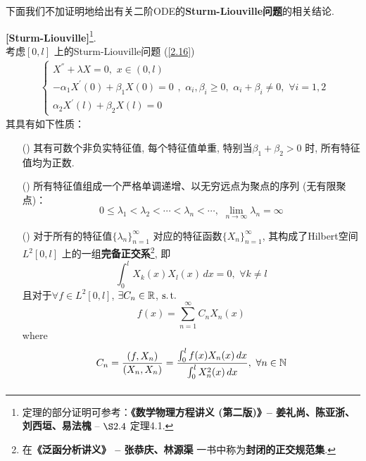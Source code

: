 	\vspace*{6em}
	
	下面我们不加证明地给出有关二阶ODE的\textbf{Sturm-Liouville问题}的相关结论. 
	
	\newpage
	
	\begin{thm}\label{thm 2.3.4}
		\textbf{[Sturm-Liouville]}\footnote{定理的部分证明可参考：\textbf{《数学物理方程讲义 (第二版)》--  姜礼尚、陈亚浙、刘西垣、易法槐} -- $\S 2.4$ 定理4.1. }. \\
		考虑$[0 , l]$ 上的Sturm-Liouville问题 (\ref{2.16})
		\begin{align*}
			\begin{cases}
				X^{''} + \lambda X = 0 , \,\, x \in (0 , l) \\
				-\alpha_1 X^{'}(0) + \beta_1 X(0) = 0 \\
				\alpha_2 X^{'}(l) + \beta_2 X(l) = 0
			\end{cases} , \,\, 
			\alpha_i , \beta_i \geq 0 , \,\, \alpha_i + \beta_i \neq 0 , \,\, \forall i = 1 , 2 
		\end{align*}
		其具有如下性质：
		
		\vspace*{1em}
		
		\begin{enumerate}
			\item [(\rmnum{1})] 其有可数个非负实特征值, 每个特征值单重, 特别当$\beta_1 + \beta_2 > 0$ 时, 所有特征值均为正数. 
			
			\vspace*{3em}
			
			\item[(\rmnum{2})] 所有特征值组成一个严格单调递增、以无穷远点为聚点的序列 (无有限聚点)：
			\[ 0 \leq \lambda_1 < \lambda_2 < \cdots < \lambda_n < \cdots , \,\, \lim_{n \to \infty}\lambda_n = \infty \]
			
			\vspace*{3em}
			
			\item[(\rmnum{3})] 对于所有的特征值$\{ \lambda_n \}_{n = 1}^{\infty}$ 对应的特征函数$\{ X_{n} \}_{n = 1}^{\infty}$, 其构成了Hilbert空间$L^{2}[0 , l]$ 上的一组\textbf{完备正交系}\footnote{在\textbf{《泛函分析讲义》 -- 张恭庆、林源渠} 一书中称为\textbf{封闭的正交规范集}. }, 即
			\[ \int_{0}^l X_{k}(x) X_{l}(x) \, dx = 0 , \,\, \forall k \neq l \]
			且对于$\forall f \in L^2[0 , l]$, $\exists C_n \in \mathbb{R}$, $\operatorname{s.t.}$
			\[ f(x) = \sum_{n = 1}^{\infty} C_n X_n(x) \]
			where
			\[ C_n = \frac{(f , X_n)}{(X_n , X_n)} = \frac{\int_{0}^l f(x) X_n(x) \, dx}{\int_{0}^l X_{n}^2(x) \, dx} , \,\, \forall n \in \mathbb{N} \]
			\[  \]
		\end{enumerate}
	\end{thm}

